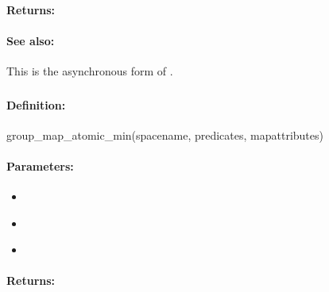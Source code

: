 \paragraph{Returns:}


\paragraph{See also:}  This is the asynchronous form of .

\pagebreak
\subsubsection{}
\label{api:ruby:group_map_atomic_min}


\paragraph{Definition:}
\begin{rubycode}
group_map_atomic_min(spacename, predicates, mapattributes)
\end{rubycode}

\paragraph{Parameters:}
\begin{itemize}[noitemsep]
\item {}\\

\item {}\\

\item {}\\

\end{itemize}

\paragraph{Returns:}


\pagebreak
\subsubsection{}
\label{api:ruby:async_group_map_atomic_min}


